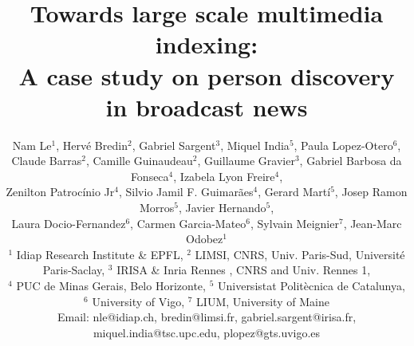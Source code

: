 \documentclass[10pt,conference,a4paper]{IEEEtran}
\begin{document}
%

\title{Towards large scale multimedia indexing: \\ A case study on person discovery in broadcast news}
%


\author{
Nam Le$^1$, Herv\'{e} Bredin$^2$, Gabriel Sargent$^3$, Miquel India$^5$, Paula Lopez-Otero$^6$, \\
Claude Barras$^2$, Camille Guinaudeau$^2$, Guillaume Gravier$^3$, Gabriel Barbosa da Fonseca$^4$, Izabela Lyon Freire$^4$, \\
Zenilton Patroc\'{i}nio Jr$^4$, Silvio Jamil F. Guimar\~{a}es$^4$, Gerard Mart\'{i}$^5$, Josep Ramon Morros$^5$, Javier Hernando$^5$, \\
Laura Docio-Fernandez$^6$, Carmen Garcia-Mateo$^6$, Sylvain Meignier$^7$, Jean-Marc Odobez$^1$\\

{\footnotesize $^1$ Idiap Research Institute \& EPFL},
{\footnotesize $^2$ LIMSI, CNRS, Univ. Paris-Sud, Université Paris-Saclay},
{\footnotesize $^3$ IRISA \& Inria Rennes , CNRS and Univ. Rennes 1}, \\
{\footnotesize $^4$ PUC de Minas Gerais, Belo Horizonte},
{\footnotesize $^5$ Universistat Politècnica de Catalunya},
{\footnotesize $^6$ University of Vigo},
{\footnotesize $^7$ LIUM, University of Maine} \\
{\footnotesize Email: nle@idiap.ch, bredin@limsi.fr, gabriel.sargent@irisa.fr, miquel.india@tsc.upc.edu, plopez@gts.uvigo.es}
}

\maketitle



\end{document}
